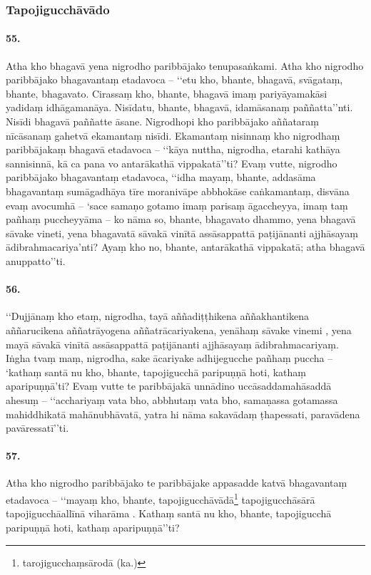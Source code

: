 \subsubsection{Tapojigucchāvādo}

\paragraph{55.} Atha kho bhagavā yena nigrodho paribbājako tenupasaṅkami. Atha kho nigrodho paribbājako bhagavantaṃ etadavoca – ‘‘etu kho, bhante, bhagavā, svāgataṃ, bhante, bhagavato. Cirassaṃ kho, bhante, bhagavā imaṃ pariyāyamakāsi yadidaṃ idhāgamanāya. Nisīdatu, bhante, bhagavā, idamāsanaṃ paññatta’’nti. Nisīdi bhagavā paññatte āsane. Nigrodhopi kho paribbājako aññataraṃ nīcāsanaṃ gahetvā ekamantaṃ nisīdi. Ekamantaṃ nisinnaṃ kho nigrodhaṃ paribbājakaṃ bhagavā etadavoca – ‘‘kāya nuttha, nigrodha, etarahi kathāya sannisinnā, kā ca pana vo antarākathā vippakatā’’ti? Evaṃ vutte, nigrodho paribbājako bhagavantaṃ etadavoca, ‘‘idha mayaṃ, bhante, addasāma bhagavantaṃ sumāgadhāya tīre moranivāpe abbhokāse caṅkamantaṃ, disvāna evaṃ avocumhā – ‘sace samaṇo gotamo imaṃ parisaṃ āgaccheyya, imaṃ taṃ pañhaṃ puccheyyāma – ko nāma so, bhante, bhagavato dhammo, yena bhagavā sāvake vineti, yena bhagavatā sāvakā vinītā assāsappattā paṭijānanti ajjhāsayaṃ ādibrahmacariya’nti? Ayaṃ kho no, bhante, antarākathā vippakatā; atha bhagavā anuppatto’’ti.

\paragraph{56.} ‘‘Dujjānaṃ kho etaṃ, nigrodha, tayā aññadiṭṭhikena aññakhantikena aññarucikena aññatrāyogena aññatrācariyakena, yenāhaṃ sāvake vinemi , yena mayā sāvakā vinītā assāsappattā paṭijānanti ajjhāsayaṃ ādibrahmacariyaṃ. Iṅgha tvaṃ maṃ, nigrodha, sake ācariyake adhijegucche pañhaṃ puccha – ‘kathaṃ santā nu kho, bhante, tapojigucchā paripuṇṇā hoti, kathaṃ aparipuṇṇā’ti? Evaṃ vutte te paribbājakā unnādino uccāsaddamahāsaddā ahesuṃ – ‘‘acchariyaṃ vata bho, abbhutaṃ vata bho, samaṇassa gotamassa mahiddhikatā mahānubhāvatā, yatra hi nāma sakavādaṃ ṭhapessati, paravādena pavāressatī’’ti.

\paragraph{57.} Atha kho nigrodho paribbājako te paribbājake appasadde katvā bhagavantaṃ etadavoca – ‘‘mayaṃ kho, bhante, tapojigucchāvādā\footnote{tarojigucchaṃsārodā (ka.)} tapojigucchāsārā tapojigucchāallīnā viharāma . Kathaṃ santā nu kho, bhante, tapojigucchā paripuṇṇā hoti, kathaṃ aparipuṇṇā’’ti?

